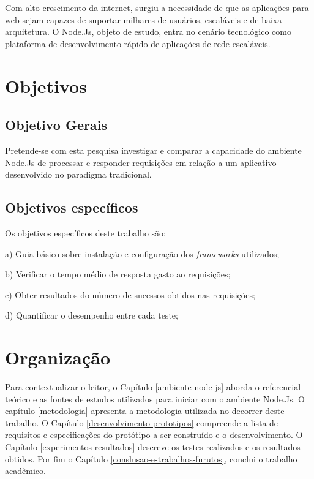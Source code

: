   Com alto crescimento da internet, surgiu a necessidade de que as aplicações para web sejam capazes de suportar milhares de usuários,
  escaláveis e de baixa arquitetura. O Node.Js, objeto de estudo, entra no cenário tecnológico como plataforma de desenvolvimento rápido
  de aplicações de rede escaláveis.
  
\section{Objetivos}
\label{objetivos}


\subsection{Objetivo Gerais}

  Pretende-se com esta pesquisa investigar e comparar a capacidade 
  do ambiente Node.Js de processar e responder requisições em relação a um aplicativo desenvolvido 
  no paradigma tradicional.
 
  
\subsection{Objetivos específicos}

  Os objetivos específicos deste trabalho são:
  
    \begin{compactitem}
      \item[a)] Guia básico sobre instalação e configuração dos \textit{frameworks} utilizados;
      \item[b)] Verificar o tempo médio de resposta gasto ao requisições;
      \item[c)] Obter resultados do número de sucessos obtidos nas requisições;
      \item[d)] Quantificar o desempenho entre cada teste;
    \end{compactitem}
  
  
\section{Organização}
\label{organizacao}  

  Para contextualizar o leitor, o Capítulo \ref{ambiente-node-js} aborda o referencial teórico e as fontes de estudos utilizados para iniciar com o ambiente 
  Node.Js. O capítulo \ref{metodologia} apresenta a metodologia utilizada no decorrer deste trabalho. O Capítulo \ref{desenvolvimento-prototipos} compreende a lista de requisitos e especificações do protótipo a ser construído e o
  desenvolvimento. O Capítulo \ref{experimentos-resultados} descreve os testes realizados e os resultados obtidos. 
  Por fim o Capítulo \ref{conslusao-e-trabalhos-furutos}, conclui o trabalho acadêmico.